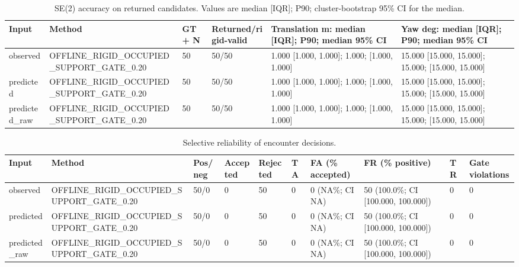 


\begin{table}[t]
\centering
\small
\caption{SE(2) accuracy on returned candidates. Values are median [IQR]; P90; cluster-bootstrap 95\% CI for the median.}
\label{tab:transform-accuracy}
\begin{tabular}{llllll}
\toprule
Input & Method & GT+ N & Returned/rigid-valid & Translation m: median [IQR]; P90; median 95\% CI & Yaw deg: median [IQR]; P90; median 95\% CI \\
\midrule
observed & OFFLINE\_RIGID\_OCCUPIED\_SUPPORT\_GATE\_0.20 & 50 & 50/50 & 1.000 [1.000, 1.000]; 1.000; [1.000, 1.000] & 15.000 [15.000, 15.000]; 15.000; [15.000, 15.000] \\
predicted & OFFLINE\_RIGID\_OCCUPIED\_SUPPORT\_GATE\_0.20 & 50 & 50/50 & 1.000 [1.000, 1.000]; 1.000; [1.000, 1.000] & 15.000 [15.000, 15.000]; 15.000; [15.000, 15.000] \\
predicted\_raw & OFFLINE\_RIGID\_OCCUPIED\_SUPPORT\_GATE\_0.20 & 50 & 50/50 & 1.000 [1.000, 1.000]; 1.000; [1.000, 1.000] & 15.000 [15.000, 15.000]; 15.000; [15.000, 15.000] \\
\bottomrule
\end{tabular}
\end{table}

\begin{table}[t]
\centering
\small
\caption{Selective reliability of encounter decisions.}
\label{tab:transform-reliability}
\begin{tabular}{llllllllll}
\toprule
Input & Method & Pos/neg & Accepted & Rejected & TA & FA (\% accepted) & FR (\% positive) & TR & Gate violations \\
\midrule
observed & OFFLINE\_RIGID\_OCCUPIED\_SUPPORT\_GATE\_0.20 & 50/0 & 0 & 50 & 0 & 0 (NA\%; CI NA) & 50 (100.0\%; CI [100.000, 100.000]) & 0 & 0 \\
predicted & OFFLINE\_RIGID\_OCCUPIED\_SUPPORT\_GATE\_0.20 & 50/0 & 0 & 50 & 0 & 0 (NA\%; CI NA) & 50 (100.0\%; CI [100.000, 100.000]) & 0 & 0 \\
predicted\_raw & OFFLINE\_RIGID\_OCCUPIED\_SUPPORT\_GATE\_0.20 & 50/0 & 0 & 50 & 0 & 0 (NA\%; CI NA) & 50 (100.0\%; CI [100.000, 100.000]) & 0 & 0 \\
\bottomrule
\end{tabular}
\end{table}

